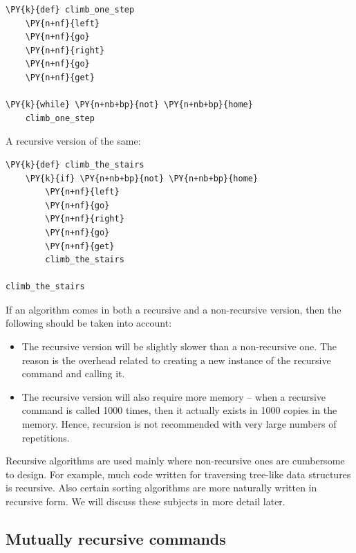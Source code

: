 \begin{bbox}
\begin{Verbatim}[commandchars=\\\{\}]
\PY{k}{def} climb_one_step
    \PY{n+nf}{left}
    \PY{n+nf}{go}
    \PY{n+nf}{right}
    \PY{n+nf}{go}
    \PY{n+nf}{get}

\PY{k}{while} \PY{n+nb+bp}{not} \PY{n+nb+bp}{home}
    climb_one_step
\end{Verbatim}
\end{bbox}
\vspace{6mm}

\noindent
A recursive version of the same:\\

\begin{bbox}
\begin{Verbatim}[commandchars=\\\{\}]
\PY{k}{def} climb_the_stairs
    \PY{k}{if} \PY{n+nb+bp}{not} \PY{n+nb+bp}{home}
        \PY{n+nf}{left}
        \PY{n+nf}{go}
        \PY{n+nf}{right}
        \PY{n+nf}{go}
        \PY{n+nf}{get}
        climb_the_stairs

climb_the_stairs
\end{Verbatim}
\end{bbox}
\vspace{6mm}

\noindent
If an algorithm comes in both a recursive and a non-recursive version, then the following 
should be taken into account:
\begin{itemize}
\item The recursive version will be slightly slower than a non-recursive one. The reason is 
      the overhead related to creating a new instance of the recursive command and calling it. 
\item The recursive version will also require more memory -- when a recursive command is called 
      1000 times, then it actually exists in 1000 copies in the memory. Hence, recursion is 
      not recommended with very large numbers of repetitions.
\end{itemize}
Recursive algorithms are used mainly where non-recursive ones are cumbersome to design. 
For example, much code written for traversing tree-like data structures is recursive. Also certain 
sorting algorithms are more naturally written in recursive form. We will discuss these subjects 
in more detail later.

\subsection[\ \ Mutually recursive commands]{Mutually recursive commands}

